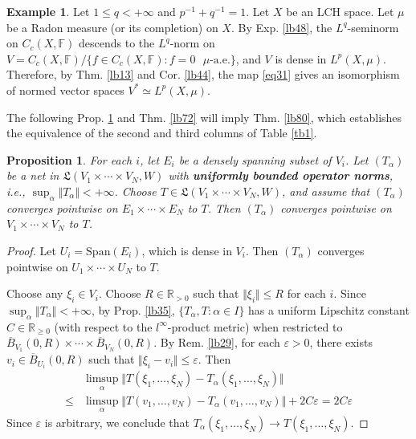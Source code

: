 \documentclass[12pt,b5paper,notitlepage]{article}
\theoremstyle{definition}
\newtheorem{eg}[df]{Example}
\theoremstyle{plain}
\newtheorem{pp}[df]{Proposition}
\newcommand{\fk}{\mathfrak}
\newcommand{\ovl}{\overline}
\newcommand{\Span}{\mathrm{Span}}
\newcommand{\Rbb}{\mathbb R}
\newcommand{\Fbb}{\mathbb F}
\newcommand{\eps}{\varepsilon}
\numberwithin{equation}{section}
\begin{document}
\begin{eg}\label{lb49}
Let $1\leq q<+\infty$ and $p^{-1}+q^{-1}=1$. Let $X$ be an LCH space. Let $\mu$ be a Radon measure (or its completion) on $X$. By Exp. \ref{lb48}, the $L^q$-seminorm on $C_c(X,\Fbb)$ descends to the $L^q$-norm on $V=C_c(X,\Fbb)/\{f\in C_c(X,\Fbb):f=0\text{ $\mu$-a.e.}\}$, and $V$ is dense in $L^p(X,\mu)$. Therefore, by Thm. \ref{lb13} and Cor. \ref{lb44}, the map \eqref{eq31} gives an isomorphism of normed vector spaces $V^*\simeq L^p(X,\mu)$.
\end{eg}

The following Prop. \ref{lb73} and Thm. \ref{lb72} will imply Thm. \ref{lb80}, which establishes the equivalence of the second and third columns of Table \ref{tb1}.

\begin{pp}\label{lb73}
For each $i$, let $E_i$ be a densely spanning subset of $V_i$. Let $(T_\alpha)$ be a net in $\fk L(V_1\times\cdots\times V_N,W)$ with \textbf{uniformly bounded operator norms},  i.e., $\sup_\alpha\Vert T_\alpha\Vert<+\infty$. Choose $T\in\fk L(V_1\times\cdots\times V_N,W)$, and assume that $(T_\alpha)$ converges pointwise on $E_1\times\cdots\times E_N$ to $T$. Then $(T_\alpha)$ converges pointwise on $V_1\times\cdots\times V_N$ to $T$.
\end{pp}

\begin{proof}
Let $U_i=\Span(E_i)$, which is dense in $V_i$. Then $(T_\alpha)$ converges pointwise on $U_1\times\cdots\times U_N$ to $T$.

Choose any $\xi_i\in V_i$. Choose $R\in\Rbb_{>0}$ such that $\Vert\xi_i\Vert\leq R$ for each $i$. Since $\sup_\alpha\Vert T_\alpha\Vert<+\infty$, by Prop. \ref{lb35}, $\{T_\alpha,T:\alpha\in I\}$ has a uniform Lipschitz constant $C\in \Rbb_{\geq0}$ (with respect to the $l^\infty$-product metric) when restricted to $\ovl B_{V_1}(0,R)\times\cdots\times \ovl B_{V_N}(0,R)$. By Rem. \ref{lb29}, for each $\eps>0$, there exists $v_i\in\ovl B_{U_i}(0,R)$ such that $\Vert \xi_i-v_i\Vert\leq\eps$. Then
\begin{align*}
&\limsup_\alpha \Vert T(\xi_1,\dots,\xi_N)-T_\alpha(\xi_1,\dots,\xi_N)\Vert\\
\leq&\limsup_\alpha \Vert T(v_1,\dots,v_N)-T_\alpha(v_1,\dots,v_N)\Vert+2C\eps=2C\eps
\end{align*}
Since $\eps$ is arbitrary, we conclude that $T_\alpha(\xi_1,\dots,\xi_N)\rightarrow T(\xi_1,\dots,\xi_N)$.
\end{proof}
\end{document}

